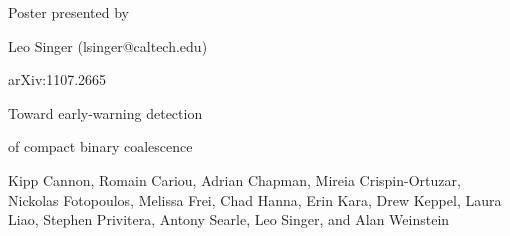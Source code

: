 \documentclass[portrait,plainboxedsections]{sciposter}
\begin{document}
\begin{minipage}[b]{0.25\textwidth}
\raggedleft
{\fontsize{36}{50}\selectfont
Poster presented by

Leo Singer (lsinger@caltech.edu)


}
\vspace{32mm}
 
\fontsize{36}{40}\selectfont
arXiv:1107.2665
\end{minipage}%
\hspace{0.05\textwidth}%
\begin{minipage}[b]{0.6\textwidth}
{\fontsize{80}{100}\selectfont%
Toward early-warning detection

of compact binary coalescence

\vspace{0.5em}
\fontsize{30}{40}\selectfont
	Kipp Cannon,
	Romain Cariou,
	Adrian Chapman,
	Mireia Crispin-Ortuzar,
	Nickolas Fotopoulos,
	Melissa Frei,
	Chad Hanna,
	Erin Kara,
	Drew Keppel,
	Laura Liao,
	Stephen Privitera,
	Antony Searle,
	Leo Singer, and
	Alan Weinstein

}
\end{minipage}
\vspace{1cm}
\end{document}
